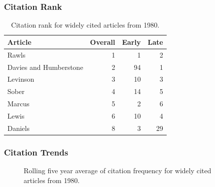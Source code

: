 \documentclass[
  10pt,
  letterpaper,
  DIV=11,
  numbers=noendperiod,
  twoside]{scrartcl}
\begin{document}
\subsubsection*{Citation Rank}\label{sec-rank-1980}

\begin{longtable}[]{@{}lrrr@{}}

\caption{\label{tbl-citation-rank-1980}Citation rank for widely cited
articles from 1980.}

\tabularnewline

\toprule\noalign{}
Article & Overall & Early & Late \\
\midrule\noalign{}
\endhead
\bottomrule\noalign{}
\endlastfoot
Rawls & 1 & 1 & 2 \\
Davies and Humberstone & 2 & 94 & 1 \\
Levinson & 3 & 10 & 3 \\
Sober & 4 & 14 & 5 \\
Marcus & 5 & 2 & 6 \\
Lewis & 6 & 10 & 4 \\
Daniels & 8 & 3 & 29 \\

\end{longtable}

\subsubsection*{Citation Trends}\label{sec-trends-1980}

\begin{figure}


\caption{\label{fig-citation-spaghetti-1980}Rolling five year average of
citation frequency for widely cited articles from 1980.}

\end{figure}%
\end{document}
